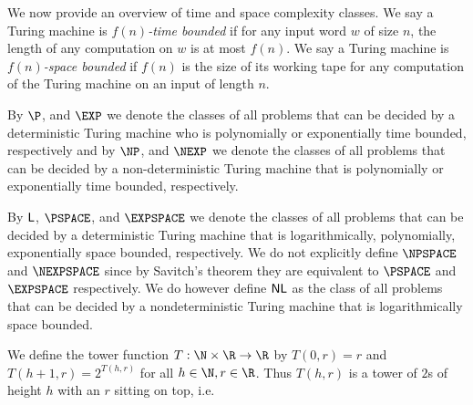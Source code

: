 We now provide an overview of time and space complexity classes. 
We say a Turing machine is
{\em $f(n)$-time bounded} if %
for any input word $w$ of size $n$, the length of any computation on $w$ is at most $f(n)$. 
We say a Turing machine is
{\em $f(n)$-space bounded} if $f(n)$ is the size of its working tape 
for any computation of the Turing machine on an input of length $n$.


 
By $\P$, and $\EXP$ we denote the classes of all problems that can be decided by a deterministic Turing machine who is polynomially or exponentially time bounded, respectively and
by
 $\NP$, and $\NEXP$ we denote the classes of all problems that can be decided by a non-deterministic Turing machine that is polynomially or exponentially time bounded, respectively. 

By ${\sf L}$, $\PSPACE$, and $\EXPSPACE$ we denote the classes of all problems that can be decided
by a deterministic Turing machine that is logarithmically, polynomially, exponentially space bounded, respectively. We do not explicitly define 
$\NPSPACE$ and $\NEXPSPACE$
since by Savitch’s theorem \cite{Sav70} they are equivalent to 
$\PSPACE$ and $\EXPSPACE$ respectively.
We do however define ${\sf NL}$ as the 
class of all problems that can be decided
by a nondeterministic Turing machine that is logarithmically space bounded.


%
%



We define the tower function $T : \N \times \R \to \R$ by $T(0,r) =r$ and
$T(h+1,r)= 2^{T(h,r)}$ for all $h \in \N, r \in \R$. Thus $T(h,r)$ is a tower of $2$s of height $h$ with an $r$ sitting on top, i.e.

	
